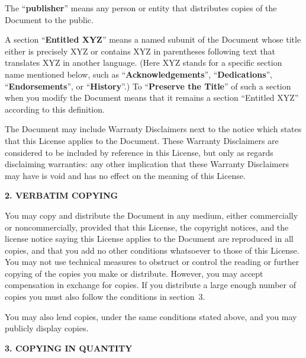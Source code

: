 \documentclass{article}
\begin{document}
	The ``\textbf{publisher}'' means any person or entity that distributes
	copies of the Document to the public.
	
	A section ``\textbf{Entitled XYZ}'' means a named subunit of the Document whose
	title either is precisely XYZ or contains XYZ in parentheses following
	text that translates XYZ in another language.  (Here XYZ stands for a
	specific section name mentioned below, such as ``\textbf{Acknowledgements}'',
	``\textbf{Dedications}'', ``\textbf{Endorsements}'', or ``\textbf{History}''.)  
	To ``\textbf{Preserve the Title}''
	of such a section when you modify the Document means that it remains a
	section ``Entitled XYZ'' according to this definition.
	
	The Document may include Warranty Disclaimers next to the notice which
	states that this License applies to the Document.  These Warranty
	Disclaimers are considered to be included by reference in this
	License, but only as regards disclaiming warranties: any other
	implication that these Warranty Disclaimers may have is void and has
	no effect on the meaning of this License.
	
	
	\begin{center}
		{\Large\bf 2. VERBATIM COPYING\par}
	\end{center}
	
	You may copy and distribute the Document in any medium, either
	commercially or noncommercially, provided that this License, the
	copyright notices, and the license notice saying this License applies
	to the Document are reproduced in all copies, and that you add no other
	conditions whatsoever to those of this License.  You may not use
	technical measures to obstruct or control the reading or further
	copying of the copies you make or distribute.  However, you may accept
	compensation in exchange for copies.  If you distribute a large enough
	number of copies you must also follow the conditions in section~3.
	
	You may also lend copies, under the same conditions stated above, and
	you may publicly display copies.
	
	
	\begin{center}
		{\Large\bf 3. COPYING IN QUANTITY\par}
	\end{center}
	
\end{document}
